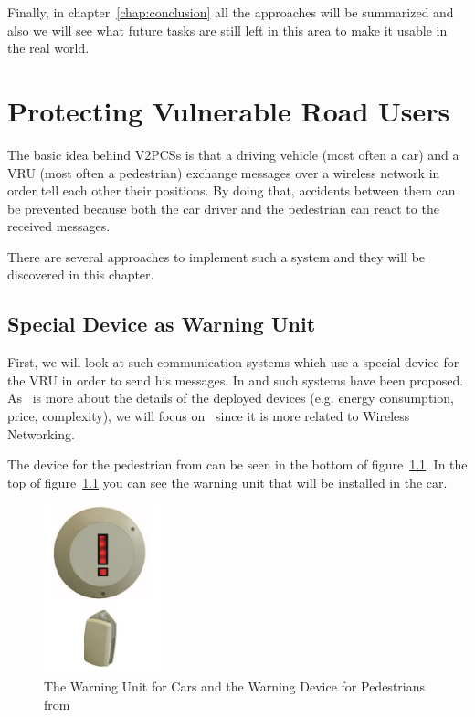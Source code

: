 \documentclass[]{ccs-thesis}
\begin{document}
Finally, in chapter~\ref{chap:conclusion} all the approaches will be summarized and also we will see what future tasks are still left in this area to make it usable in the real world.


\chapter{Protecting Vulnerable Road Users}
\label{chap:v2p}

The basic idea behind \acp{V2PCS} is that a driving vehicle (most often a car) and a \ac{VRU} (most often a pedestrian) exchange messages over a wireless network in order tell each other their positions. By doing that, accidents between them can be prevented because both the car driver and the pedestrian can react to the received messages.

There are several approaches to implement such a system and they will be discovered in this chapter.

\section{Special Device as Warning Unit}\label{sec:special device}

First, we will look at such communication systems which use a special device for the \ac{VRU} in order to send his messages. In \cite{v2pprotection} and \cite{watchover} such systems have been proposed. As~\cite{watchover} is more about the details of the deployed devices (e.g. energy consumption, price, complexity), we will focus on~\cite{v2pprotection} since it is more related to Wireless Networking.

The device for the pedestrian from \cite{v2pprotection} can be seen in the bottom of figure~\ref{fig:device}. In the top of figure~\ref{fig:device} you can see the warning unit that will be installed in the car.

\begin{figure}[h]
	\centering
	\includegraphics[width=0.3\textwidth]{figures/1_device}
	\caption{The Warning Unit for Cars and the Warning Device for Pedestrians from \cite{v2pprotection}}%
	\label{fig:device}%
\end{figure}
\end{document}
